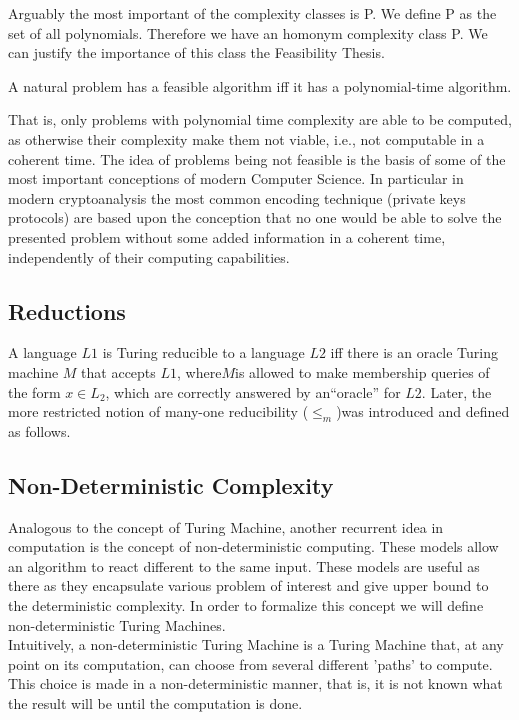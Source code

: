 Arguably the most important of the complexity classes is P. We define P as the set of all polynomials. Therefore we have an homonym complexity class P. We can justify the importance of this class the Feasibility Thesis.

\begin{thesis}
A natural problem has a feasible algorithm iff it has a polynomial-time algorithm.
\end{thesis}

That is, only problems with polynomial time complexity are able to be computed, as otherwise their complexity make them not viable, i.e., not computable in a coherent time. The idea of problems being not feasible is the basis of some of the most important conceptions of modern Computer Science. In particular in modern cryptoanalysis the most common encoding technique (private keys protocols) are based upon the conception that no one would be able to solve the presented problem without some added information in a coherent time, independently of their computing capabilities.\\



\subsection{Reductions}
A language $L1$ is Turing reducible to a language $L2$ iff there is an oracle Turing machine $M$ that accepts $L1$, where$M$is allowed to make membership queries of the form $x\in L_2$, which are correctly answered by an“oracle” for $L2$. Later, the more restricted notion of many-one reducibility ($\le_m$)was introduced and defined as follows.


\subsection{Non-Deterministic Complexity}

Analogous to the concept of Turing Machine, another recurrent idea in computation is the concept of non-deterministic computing. These models allow an algorithm to react different to the same input. These models are useful as there as they encapsulate various problem of interest and give upper bound to the deterministic complexity. In order to formalize this concept we will define non-deterministic Turing Machines.\\

Intuitively, a non-deterministic Turing Machine is a Turing Machine that, at any point on its computation, can choose from several different 'paths' to compute. This choice is made in a non-deterministic manner, that is, it is not known what the result will be until the computation is done.

